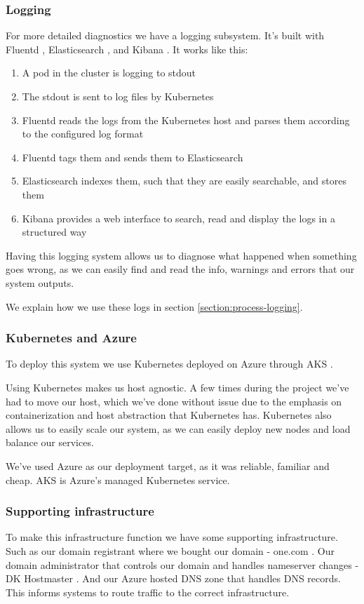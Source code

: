 \subsubsection{Logging}
For more detailed diagnostics we have a logging subsystem. It's built with Fluentd \cite{tool:fluentd}, Elasticsearch \cite{tool:elasticsearch}, and Kibana \cite{tool:kibana}.
It works like this:
\begin{enumerate}
  \item A pod in the cluster is logging to stdout
  \item The stdout is sent to log files by Kubernetes
  \item Fluentd reads the logs from the Kubernetes host and parses them according to the configured log format
  \item Fluentd tags them and sends them to Elasticsearch
  \item Elasticsearch indexes them, such that they are easily searchable, and stores them
  \item Kibana provides a web interface to search, read and display the logs in a structured way
\end{enumerate}
Having this logging system allows us to diagnose what happened when something goes wrong, as we can easily find and read the info, warnings and errors that our system outputs.

We explain how we use these logs in section \ref{section:process-logging}.

\subsubsection{Kubernetes and Azure}
To deploy this system we use Kubernetes \cite{tool:kubernetes} deployed on Azure \cite{tool:azure} through AKS \cite{tool:aks}.

Using Kubernetes makes us host agnostic.
A few times during the project we've had to move our host, which we've done without issue due to the emphasis on containerization and host abstraction that Kubernetes has.
Kubernetes also allows us to easily scale our system, as we can easily deploy new nodes and load balance our services.

We've used Azure as our deployment target, as it was reliable, familiar and cheap. AKS is Azure's managed Kubernetes service.

\subsubsection{Supporting infrastructure}
To make this infrastructure function we have some supporting infrastructure.
Such as our domain registrant where we bought our domain - one.com \cite{onecom}.
Our domain administrator that controls our domain and handles nameserver changes - DK Hostmaster \cite{dk-hostmaster}.
And our Azure hosted DNS zone \cite{tool:dns-zone} that handles DNS records. This informs systems to route traffic to the correct infrastructure.
